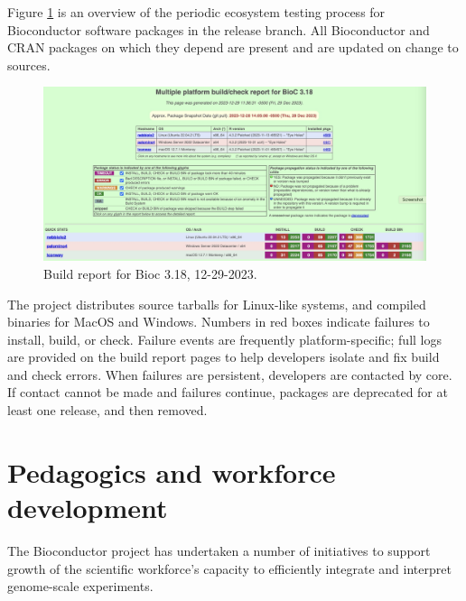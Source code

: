 Figure \ref{fig:qapic} is an overview of the periodic ecosystem
testing process for Bioconductor software packages in the
release branch. All Bioconductor
and CRAN packages on which they depend are present and are updated
on change to sources.

\begin{figure}
\includegraphics[width=1.21\linewidth,]{QApage} \caption{Build report for Bioc 3.18, 12-29-2023.}\label{fig:qapic}
\end{figure}

The project distributes source tarballs for Linux-like systems, and
compiled binaries for MacOS and Windows. Numbers in red boxes indicate
failures to install, build, or check. Failure events are
frequently platform-specific; full logs are provided
on the build report pages to help developers isolate and fix
build and check errors. When failures are persistent, developers
are contacted by core. If contact cannot be made and failures
continue, packages are deprecated for at least one release, and
then removed.

\hypertarget{pedagogics-and-workforce-development}{%
\section{Pedagogics and workforce development}\label{pedagogics-and-workforce-development}}

The Bioconductor project has undertaken a number
of initiatives to support growth of the
scientific workforce's capacity to efficiently
integrate and interpret
genome-scale experiments.

